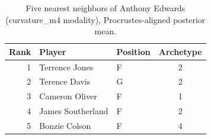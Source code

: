 \begin{table}[htbp]
  \centering\small
  \begin{tabular}{rllc}
    \toprule
    Rank & Player & Position & Archetype \\
    \midrule
    1 & Terrence Jones & F & 2 \\
    2 & Terence Davis & G & 2 \\
    3 & Cameron Oliver & F & 1 \\
    4 & James Southerland & F & 2 \\
    5 & Bonzie Colson & F & 4 \\
    \bottomrule
  \end{tabular}
  \caption{Five nearest neighbors of Anthony Edwards (curvature_m4 modality), Procrustes-aligned posterior mean.}
  \label{tab:Anthony_Edwards_neighbors_curvature_m4}
\end{table}

